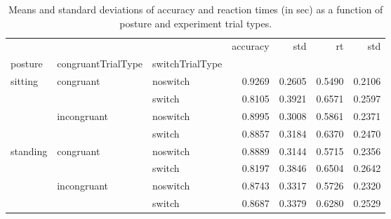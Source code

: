 \begin{table}
\centering
\caption{Means and standard deviations of accuracy and reaction times (in sec) as a function of posture and experiment trial types.}
\label{table-task-switching-replication-reaction-time}
\begin{tabular}{lllrrrr}
\toprule
         &             &        & accuracy &    std &     rt &    std \\
posture & congruantTrialType & switchTrialType &          &        &        &        \\
\midrule
sitting & congruant & noswitch &   0.9269 & 0.2605 & 0.5490 & 0.2106 \\
         &             & switch &   0.8105 & 0.3921 & 0.6571 & 0.2597 \\
         & incongruant & noswitch &   0.8995 & 0.3008 & 0.5861 & 0.2371 \\
         &             & switch &   0.8857 & 0.3184 & 0.6370 & 0.2470 \\
standing & congruant & noswitch &   0.8889 & 0.3144 & 0.5715 & 0.2356 \\
         &             & switch &   0.8197 & 0.3846 & 0.6504 & 0.2642 \\
         & incongruant & noswitch &   0.8743 & 0.3317 & 0.5726 & 0.2320 \\
         &             & switch &   0.8687 & 0.3379 & 0.6280 & 0.2529 \\
\bottomrule
\end{tabular}
\end{table}
